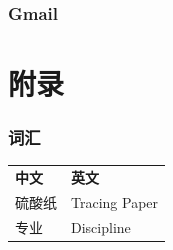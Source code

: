 \documentclass[paper=a4,fontsize=11pt]{article}
\begin{document}
	\section{Gmail}
	
	
	
	
	\clearpage
	\part{附录}
	\clearpage
	\section{词汇}
	\begin{tabular}{ll}			
		\multirow{1}{*}{\textbf{中文}}			
		& \multicolumn{1}{l}{\textbf{英文}}\\			
		硫酸纸 & Tracing Paper\\
		专业 & Discipline\footnotemark[1]\\
	\end{tabular}
	\clearpage	
\end{document}
